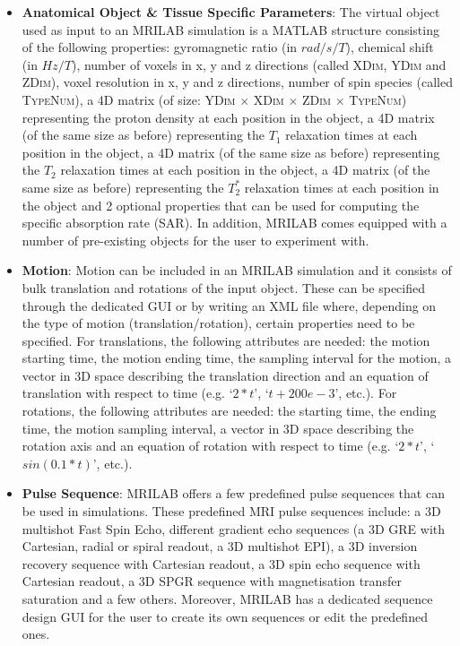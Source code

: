 \begin{itemize}
    
    \item \textbf{Anatomical Object \& Tissue Specific Parameters}: The virtual object used as input to an MRILAB simulation is a MATLAB structure consisting of the following properties:
    gyromagnetic ratio (in $rad/s/T$), chemical shift (in $Hz/T$), 
    number of voxels in x, y and z directions (called \textsc{XDim}, \textsc{YDim} and \textsc{ZDim}),
    voxel resolution in x, y and z directions, 
    number of spin species (called \textsc{TypeNum}),
    a 4D matrix (of size: \textsc{YDim $\times$ XDim $\times$ ZDim $\times$ TypeNum}) representing the proton density at each position in the object, 
    a 4D matrix (of the same size as before) representing the $T_1$ relaxation times at each position in the object, 
    a 4D matrix (of the same size as before) representing the $T_2$ relaxation times at each position in the object,
    a 4D matrix (of the same size as before) representing the $T_2^*$ relaxation times at each position in the object and 
    2 optional properties that can be used for computing the specific absorption rate (SAR).
    In addition, MRILAB comes equipped with a number of pre-existing objects for the user to experiment with.
    
    \item \textbf{Motion}: Motion can be included in an MRILAB simulation and it consists of bulk translation and rotations of the input object.
    These can be specified through the dedicated GUI or by writing an XML file where, depending on the type of motion (translation/rotation), certain properties need to be specified. 
    For translations, the following attributes are needed:
    the motion starting time,
    the motion ending time,
    the sampling interval for the motion,
    a vector in 3D space describing the translation direction
    and an equation of translation with respect to time (e.g. `$2*t$', `$t+200e-3$', etc.).
    For rotations, the following attributes are needed:
    the starting time,
    the ending time,
    the motion sampling interval,
    a vector in 3D space describing the rotation axis and
    an equation of rotation with respect to time (e.g. `$2*t$', `$sin(0.1*t)$', etc.).
    
    \item \textbf{Pulse Sequence}: MRILAB offers a few predefined pulse sequences that can be used in simulations.
    These predefined MRI pulse sequences include: 
    a 3D multishot Fast Spin Echo,
    different gradient echo sequences (a 3D GRE with Cartesian, radial or spiral readout, a 3D multishot EPI),
    a 3D inversion recovery sequence with Cartesian readout, 
    a 3D spin echo sequence with Cartesian readout,
    a 3D SPGR sequence with magnetisation transfer saturation and a few others.
    Moreover, MRILAB has a dedicated sequence design GUI for the user to create its own sequences or edit the predefined ones.
    

\end{itemize}

